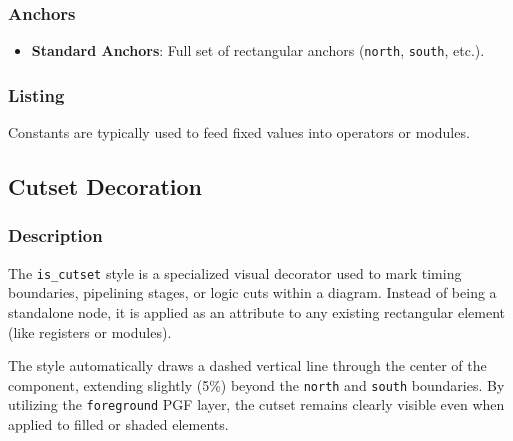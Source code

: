     \subsubsection{\sffamily Anchors}
        \begin{itemize}
            \item \textbf{Standard Anchors}: Full set of rectangular anchors (\texttt{north}, \texttt{south}, etc.).
        \end{itemize}

    \subsubsection{\sffamily Listing}
        Constants are typically used to feed fixed values into operators or modules.

\begin{RTLexample}
\end{RTLexample}

\subsection{\sffamily Cutset Decoration}

    \subsubsection{\sffamily Description}
        The \texttt{is\_cutset} style is a specialized visual decorator used to mark timing boundaries, pipelining stages, or logic cuts within a diagram. Instead of being a standalone node, it is applied as an attribute to any existing rectangular element (like registers or modules).
        
        The style automatically draws a dashed vertical line through the center of the component, extending slightly (5\%) beyond the \texttt{north} and \texttt{south} boundaries. By utilizing the \texttt{foreground} PGF layer, the cutset remains clearly visible even when applied to filled or shaded elements.

